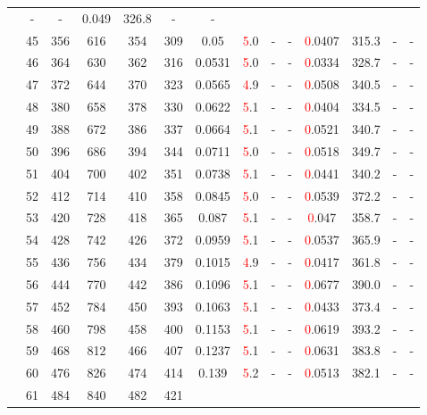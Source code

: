 \begin{table}[htb]
{\begin{tabular}{|c|c|c|c|c|c|c|c|c|c|c|c|c|c|}
 & - & -
 & 0.049 & 326.8
 & - & -
 \\
 & 
45 & 356 & 616 & 354 & 309
 & 0.05 & \textcolor{red}5.0
 & - & -
 & \textcolor{red}0.0407 & 315.3
 & - & -
 \\
 & 
46 & 364 & 630 & 362 & 316
 & 0.0531 & \textcolor{red}5.0
 & - & -
 & \textcolor{red}0.0334 & 328.7
 & - & -
 \\
 & 
47 & 372 & 644 & 370 & 323
 & 0.0565 & \textcolor{red}4.9
 & - & -
 & \textcolor{red}0.0508 & 340.5
 & - & -
 \\
 & 
48 & 380 & 658 & 378 & 330
 & 0.0622 & \textcolor{red}5.1
 & - & -
 & \textcolor{red}0.0404 & 334.5
 & - & -
 \\
 & 
49 & 388 & 672 & 386 & 337
 & 0.0664 & \textcolor{red}5.1
 & - & -
 & \textcolor{red}0.0521 & 340.7
 & - & -
 \\
 & 
50 & 396 & 686 & 394 & 344
 & 0.0711 & \textcolor{red}5.0
 & - & -
 & \textcolor{red}0.0518 & 349.7
 & - & -
 \\
 & 
51 & 404 & 700 & 402 & 351
 & 0.0738 & \textcolor{red}5.1
 & - & -
 & \textcolor{red}0.0441 & 340.2
 & - & -
 \\
 & 
52 & 412 & 714 & 410 & 358
 & 0.0845 & \textcolor{red}5.0
 & - & -
 & \textcolor{red}0.0539 & 372.2
 & - & -
 \\
 & 
53 & 420 & 728 & 418 & 365
 & 0.087 & \textcolor{red}5.1
 & - & -
 & \textcolor{red}0.047 & 358.7
 & - & -
 \\
 & 
54 & 428 & 742 & 426 & 372
 & 0.0959 & \textcolor{red}5.1
 & - & -
 & \textcolor{red}0.0537 & 365.9
 & - & -
 \\
 & 
55 & 436 & 756 & 434 & 379
 & 0.1015 & \textcolor{red}4.9
 & - & -
 & \textcolor{red}0.0417 & 361.8
 & - & -
 \\
 & 
56 & 444 & 770 & 442 & 386
 & 0.1096 & \textcolor{red}5.1
 & - & -
 & \textcolor{red}0.0677 & 390.0
 & - & -
 \\
 & 
57 & 452 & 784 & 450 & 393
 & 0.1063 & \textcolor{red}5.1
 & - & -
 & \textcolor{red}0.0433 & 373.4
 & - & -
 \\
 & 
58 & 460 & 798 & 458 & 400
 & 0.1153 & \textcolor{red}5.1
 & - & -
 & \textcolor{red}0.0619 & 393.2
 & - & -
 \\
 & 
59 & 468 & 812 & 466 & 407
 & 0.1237 & \textcolor{red}5.1
 & - & -
 & \textcolor{red}0.0631 & 383.8
 & - & -
 \\
 & 
60 & 476 & 826 & 474 & 414
 & 0.139 & \textcolor{red}5.2
 & - & -
 & \textcolor{red}0.0513 & 382.1
 & - & -
 \\
 & 
61 & 484 & 840 & 482 & 421

\end{tabular}}
\end{table}
